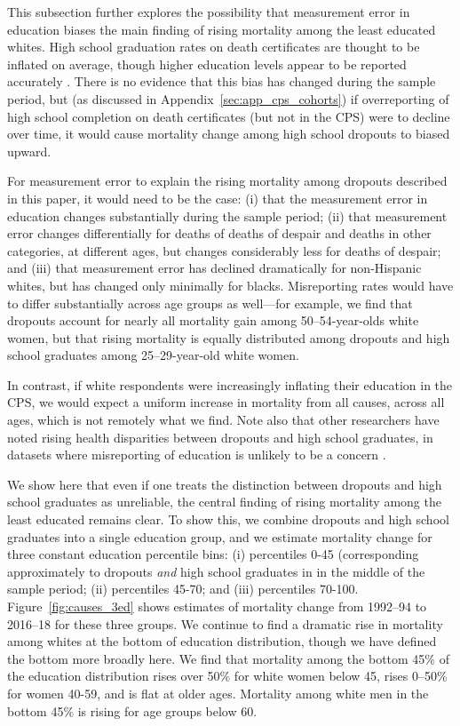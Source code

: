 This subsection further explores the possibility that measurement error in education biases the main finding of rising mortality among the least educated whites. High school graduation rates on death certificates are thought to be inflated on average, though higher education levels appear to be reported accurately \citep{Sorlie1996}.  There is no evidence that this bias has changed during the sample period, but (as discussed in Appendix~\ref{sec:app_cps_cohorts}) if overreporting of high school completion on death certificates (but not in the CPS) were to decline over time, it would cause mortality change among high school dropouts to biased upward.

For measurement error to explain the rising mortality among dropouts described in this paper, it would need to be the case: (i) that the measurement error in education changes substantially during the sample period; (ii) that measurement error changes differentially for deaths of deaths of despair and deaths in other categories, at different ages, but changes considerably less for deaths of despair; and (iii) that measurement error has declined dramatically for non-Hispanic whites, but has changed only minimally for blacks. Misreporting rates would have to differ substantially across age groups as well---for example, we find that dropouts account for nearly all mortality gain among 50--54-year-olds white women, but that rising mortality is equally distributed among dropouts and high school graduates among 25--29-year-old white women.  

In contrast, if white respondents were increasingly inflating their education in the CPS, we would expect a uniform increase in mortality from all causes, across all ages, which is not remotely what we find. Note also that other researchers have noted rising health disparities between dropouts and high school graduates, in datasets where misreporting of education is unlikely to be a concern \citep{Montez2011}.

We show here that even if one treats the distinction between dropouts and high school graduates as unreliable, the central finding of rising mortality among the least educated remains clear. To show this, we combine dropouts and high school graduates into a single education group, and we estimate mortality change for three constant education percentile bins: (i) percentiles 0-45 (corresponding approximately to dropouts \textit{and} high school graduates in in the middle of the sample period; (ii) percentiles 45-70; and (iii) percentiles 70-100.  Figure~\ref{fig:causes_3ed} shows estimates of mortality change from 1992--94 to 2016--18 for these three groups. We continue to find a dramatic rise in mortality among whites at the bottom of education distribution, though we have defined the bottom more broadly here.  We find that mortality among the bottom 45\% of the education distribution rises over 50\% for white women below 45, rises 0--50\% for women 40-59, and is flat at older ages. Mortality among white men in the bottom 45\% is rising for age groups below 60.

